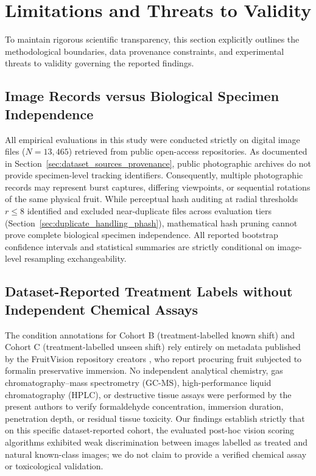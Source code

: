 \enlargethispage{\baselineskip}
\section{Limitations and Threats to Validity}
\label{sec:limitations}

To maintain rigorous scientific transparency, this section explicitly outlines the methodological boundaries, data provenance constraints, and experimental threats to validity governing the reported findings.

\vspace*{-8pt}\subsection{Image Records versus Biological Specimen Independence}
\vspace*{-2pt}
\label{sec:limitations_specimen_independence}

All empirical evaluations in this study were conducted strictly on digital image files ($N = 13,465$) retrieved from public open-access repositories. As documented in Section~\ref{sec:dataset_sources_provenance}, public photographic archives do not provide specimen-level tracking identifiers. Consequently, multiple photographic records may represent burst captures, differing viewpoints, or sequential rotations of the same physical fruit. While perceptual hash auditing at radial thresholds $r \le 8$ identified and excluded near-duplicate files across evaluation tiers (Section~\ref{sec:duplicate_handling_phash}), mathematical hash pruning cannot prove complete biological specimen independence. All reported bootstrap confidence intervals and statistical summaries are strictly conditional on image-level resampling exchangeability.

\enlargethispage{3\baselineskip}
\vspace*{-10pt}\subsection{Dataset-Reported Treatment Labels without Independent Chemical Assays}
\vspace*{-3pt}
\label{sec:limitations_treatment_labels}

The condition annotations for Cohort B (treatment-labelled known shift) and Cohort C (treatment-labelled unseen shift) rely entirely on metadata published by the FruitVision repository creators \cite{bijoy2025fruitvision}, who report procuring fruit subjected to formalin preservative immersion. No independent analytical chemistry, gas chromatography--mass spectrometry (GC-MS), high-performance liquid chromatography (HPLC), or destructive tissue assays were performed by the present authors to verify formaldehyde concentration, immersion duration, penetration depth, or residual tissue toxicity. Our findings establish strictly that on this specific dataset-reported cohort, the evaluated post-hoc vision scoring algorithms exhibited weak discrimination between images labelled as treated and natural known-class images; we do not claim to provide a verified chemical assay or toxicological validation.

